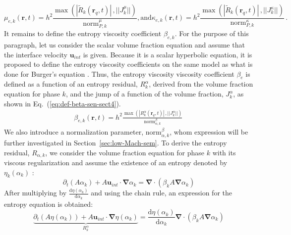\documentclass[preprint,10pt]{elsarticle}
\renewcommand{\div}{\mbold{\nabla}\! \cdot \!}
\newcommand{\grad}{\mbold{\nabla}}
\newcommand{\mbold}[1]{\boldsymbol#1}
\newcommand{\norm}{\textrm{norm}}
\newcommand{\resi}{R}
\newcommand{\resinew}{\widetilde{\resi}}
\newcommand{\eqt}[1]{Eq.~(\ref{#1})}                     %
\newcommand{\sct}[1]{Section~\ref{#1}}                   %
\begin{document}
%
\begin{subequations}\label{eq:visc_definition-sct4}
\begin{equation}
\mu_{e,k}(\mbold r,t)    = h^2 \frac{\max\left( | \resinew_k(\mbold r_q,t) |\,, || J_k^\mu || \right)}{\norm_{P,k}^\mu},
\end{equation} 
\text{and} 
\begin{equation}
\kappa_{e,k}(\mbold r,t) = h^2 \frac{\max\left( | \resinew_k(\mbold r_q,t) |\,, || J_k^\kappa || \right)}{\norm_{P,k}^\kappa} \, .
\end{equation}
\end{subequations}
%
It remains to define the entropy viscosity coefficient $\beta_{e,k}$. For the purpose of this paragraph, let us consider the scalar volume fraction equation and assume that the interface velocity $\mbold u_{int}$ is given. Because it is a scalar hyperbolic equation, it is proposed to define the entropy viscosity coefficients on the same model as what is done for Burger's equation \cite{jlg1, jlg2}. Thus, the entropy viscosity viscosity coefficient $\beta_e$ is defined as a function of an entropy residual, $R_{k}^\alpha$, derived from the volume fraction equation for phase $k$, and the jump of a function of the volume fraction, $J_k^\alpha$, as shown in \eqt{eq:def-beta-sen-sect4}.
%
\begin{align}\label{eq:def-beta-sen-sect4}
\beta_{e,k}( \mbold r, t) = h^2 \frac{\max\left( | R_{k}^\alpha(\mbold r_q,t) |\,, || J_k^\alpha|| \right)}{\norm_{\alpha, k}^\beta} \,
\end{align}
%
We also introduce a normalization parameter, $\norm_{\alpha,k}^\beta$, whom expression will be further investigated in \sct{sec:low-Mach-sem}. To derive the entropy residual, $R_{\alpha,k}$, we consider the volume fraction equation for phase $k$ with its viscous regularization and assume the existence of an entropy denoted by $\eta_k(\alpha_k)$ \cite{Leveque}:
%
\begin{equation}\label{eq:vf-sem-sct4}
\partial_t \left(A \alpha_k \right) + A \mbold u_{int} \cdot \grad \alpha_k = \div \left( \beta_k A \grad \alpha_k \right)
\end{equation}
% 
After multiplying by $\frac{\text{d} \eta (\alpha_k)}{\text{d} \alpha_k}$ and using the chain rule, an expression for the entropy equation is obtained:
%
\begin{equation}\label{eq:vf-sem2-sct4}
\underbrace{\partial_t \left(A \eta(\alpha_k) \right) + A \mbold u_{int} \cdot \grad \eta(\alpha_k)}_{R_{k}^\alpha} = \frac{\text{d} \eta (\alpha_k)}{\text{d} \alpha_k} \div \left( \beta_k A \grad \alpha_k \right)
\end{equation}
\end{document}
